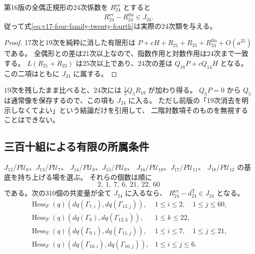 \begin{corollary}[全偶正規形の二十四次類]
\label{cor:v17-evenization-twenty-fourth-class}
第16版の全偶正規形の24次係数を $R_{24}^{\mathrm{ev}}$ とすると
\[
                   R_{24}^{\mathrm{ev}}-R_{24}^{\mathrm{fin}}\in J_{24}.
\]
従って式\eqref{eq:v17-four-family-twenty-fourth}は実際の24次類を与える。
\end{corollary}

\begin{proof}
17次と19次を純粋に消した有限形は
$P+cH+R_{21}+R_{23}+R_{24}^{\mathrm{fin}}+O(a^{25})$ である。
全偶形との差は21次以上なので、指数作用と対数作用は24次まで一致する。
$L(R_{21}+R_{23})$ は25次以上であり、24次の差は $Q_{18}P+cQ_{14}H$ となる。
この二項はともに $J_{24}$ に属する。
\end{proof}

\begin{remark}[十九次を残す直接比較]
19次を残したまま比べると、24次には
$\tfrac12Q_5R_{19}$ が加わり得る。
$Q_5P=0$ から $Q_5$ は通常像を保存するので、この項も $J_{24}$ に入る。
ただし前版の「19次消去を明示しなくてよい」という結論だけを引用して、
二階対数項そのものを無視することはできない。
\end{remark}

\subsection{三百十組による有限の所属条件}

\begin{proposition}[二十四次補正の有限検査]
\label{prop:v17-three-hundred-ten-pairings}
$J_{12}/P\mathcal U_6$、$J_{13}/P\mathcal U_7$、
$J_{14}/P\mathcal U_8$、$J_{15}/P\mathcal U_9$、
$J_{16}/P\mathcal U_{10}$、$J_{17}/P\mathcal U_{11}$、
$J_{18}/P\mathcal U_{12}$ の基底を持ち上げる場を選ぶ。
それらの個数は順に
\[
                         2,\ 1,\ 7,\ 6,\ 21,\ 22,\ 60
\]
である。次の310個の共変量が全て $J_{24}$ に入るなら、
$R_{24}^{\mathrm{ev}}-d_{24}^{\mathrm T}\in J_{24}$ となる。
\[
\begin{array}{ll}
 \operatorname{Hess}_F(q)(dq(\Gamma_{7,i}),dq(\Gamma_{13,j})),
       &1\le i\le2,\quad1\le j\le60,\\
 \operatorname{Hess}_F(q)(dq(\Gamma_8),dq(\Gamma_{12,k})),
       &1\le k\le22,\\
 \operatorname{Hess}_F(q)(dq(\Gamma_{9,i}),dq(\Gamma_{11,j})),
       &1\le i\le7,\quad1\le j\le21,\\
 \operatorname{Hess}_F(q)(dq(\Gamma_{10,i}),dq(\Gamma_{10,j})),
       &1\le i\le j\le6.
\end{array}
\]
\end{proposition}

